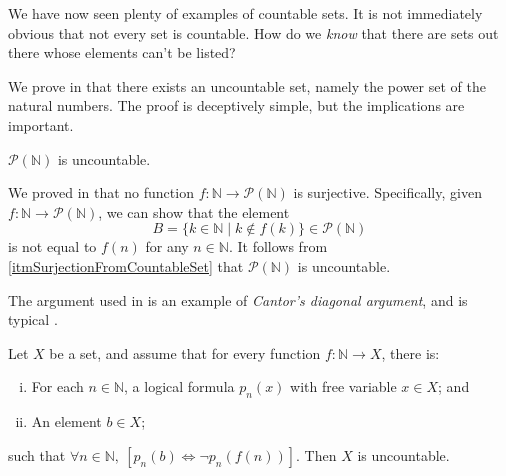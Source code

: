 We have now seen plenty of examples of countable sets. It is not immediately obvious that not every set is countable. How do we \textit{know} that there are sets out there whose elements can't be listed?

We prove in  that there exists an uncountable set, namely the power set of the natural numbers. The proof is deceptively simple, but the implications are important.

\begin{theorem}
\label{thmCantorForN}
$\mathcal{P}(\mathbb{N})$ is uncountable.
\end{theorem}

\begin{cproof}
We proved in  that no function $f : \mathbb{N} \to \mathcal{P}(\mathbb{N})$ is surjective. Specifically, given $f : \mathbb{N} \to \mathcal{P}(\mathbb{N})$, we can show that the element
\[ B = \{ k \in \mathbb{N} \mid k \not\in f(k) \} \in \mathcal{P}(\mathbb{N}) \]
is not equal to $f(n)$ for any $n \in \mathbb{N}$. It follows from \ref{itmSurjectionFromCountableSet} that $\mathcal{P}(\mathbb{N})$ is uncountable.
\end{cproof}

The argument used in  is an example of \textit{Cantor's diagonal argument}, and is typical .

\begin{theorem}
\label{thmCantorDiagonalGeneral}
Let $X$ be a set, and assume that for every function $f : \mathbb{N} \to X$, there is:
\begin{enumerate}[(i)]
\item For each $n \in \mathbb{N}$, a logical formula $p_n(x)$ with free variable $x \in X$; and
\item An element $b \in X$;
\end{enumerate}
such that $\forall n \in \mathbb{N},~ [p_n(b) \Leftrightarrow \neg p_n(f(n))]$. Then $X$ is uncountable.
\end{theorem}

